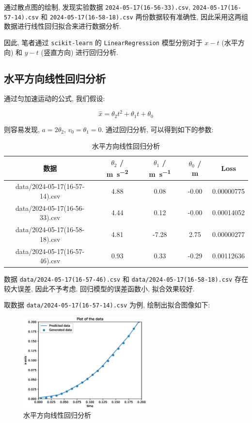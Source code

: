 \documentclass{article}
\begin{document}
通过散点图的绘制, 发现实验数据 \texttt{2024-05-17(16-56-33).csv}, \texttt{2024-05-17(16-57-14).csv} 和 \texttt{2024-05-17(16-58-18).csv} 两份数据较有准确性, 因此采用这两组数据进行线性回归拟合来进行数据分析.

因此, 笔者通过 \texttt{scikit-learn} 的 \texttt{LinearRegression} 模型分别对于 $x - t$ (水平方向) 和 $y - t$ (竖直方向) 进行回归分析.

\subsection{水平方向线性回归分析}

通过匀加速运动的公式, 我们假设:

\begin{equation}
    \hat{x} = \theta_2 t^2 + \theta_1 t + \theta_0
\end{equation}

则容易发现, $a = 2\theta_2$, $v_0 = \theta_1 = 0$. 通过回归分析, 可以得到如下的参数:

\begin{table}[H]
    \small
    \centering
    \begin{tabular}{ccccc}
        \hline
        \textbf{数据} & $\theta_2$ / \si{\meter\per\second\squared} & $\theta_1$ / \si{\meter\per\second} & $\theta_0$ / \si{\meter} & \textbf{Loss} \\
        \hline
        data/2024-05-17(16-57-14).csv & 4.88 & 0.08 & -0.00 & 0.00000775 \\
        data/2024-05-17(16-56-33).csv & 4.44 & 0.12 & -0.00 & 0.00014052 \\
        data/2024-05-17(16-58-18).csv & 4.81 & -7.28 & 2.75 & 0.00000277 \\
        data/2024-05-17(16-57-46).csv & 0.93 & 0.33 & -0.29 & 0.00112636 \\
        \hline
    \end{tabular}
    \caption{水平方向线性回归分析}
    \label{tab:linear-regression-x}
\end{table}

数据 \texttt{data/2024-05-17(16-57-46).csv} 和 \texttt{data/2024-05-17(16-58-18).csv} 存在较大误差, 因此不予考虑. 回归模型的误差函数小, 拟合效果较好.

取数据 \texttt{data/2024-05-17(16-57-14).csv} 为例, 绘制出拟合图像如下:

\begin{figure}[H]
    \centering
    \includegraphics[width=0.6\textwidth]{figures/plot-x-regression.eps}
    \caption{水平方向线性回归分析}
    \label{fig:linear-regression-x}
\end{figure}
\end{document}
